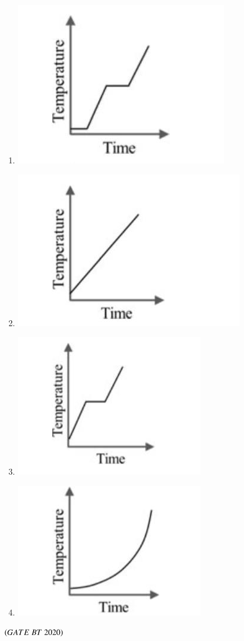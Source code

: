 \documentclass[journal,12pt,onecolumn]{IEEEtran}
\theoremstyle{remark}
\begin{document}
\begin{enumerate}[label=Q\arabic*:]
\begin{enumerate}[label=Q\arabic*:, start=26, leftmargin=2em]
\begin{multicols}{2}
\begin{enumerate}[label=\alph*)]
\item \includegraphics[width=0.4\linewidth]{figs/fig_1.jpeg}
\item \includegraphics[width=0.4\linewidth]{figs/fig_2.jpeg}
\item \includegraphics[width=0.4\linewidth]{figs/fig_3.jpeg} 
\item \includegraphics[width=0.4\linewidth]{figs/fig_4.jpeg}

\end{enumerate}
\end{multicols}
\hfill$\left(GATE\ BT\ 2020\right)$



\end{enumerate}
\end{enumerate}
\end{document}
